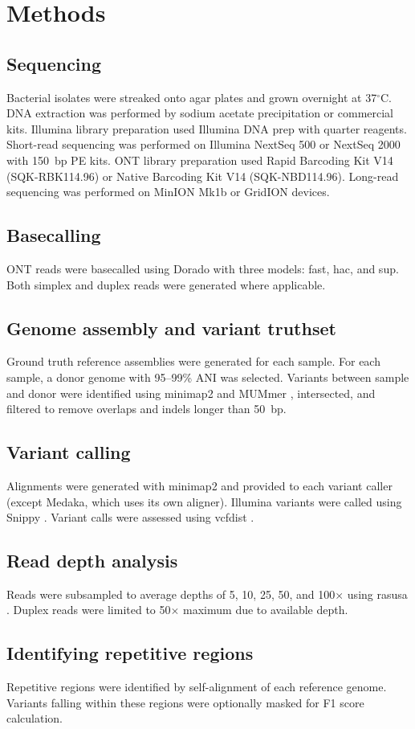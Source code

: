 \documentclass[11pt]{article}
\begin{document}
\section{Methods}

\subsection{Sequencing}
Bacterial isolates were streaked onto agar plates and grown overnight at 37$^\circ$C. DNA extraction was performed by sodium acetate precipitation or commercial kits. Illumina library preparation used Illumina DNA prep with quarter reagents. Short-read sequencing was performed on Illumina NextSeq 500 or NextSeq 2000 with 150~bp PE kits. ONT library preparation used Rapid Barcoding Kit V14 (SQK-RBK114.96) or Native Barcoding Kit V14 (SQK-NBD114.96). Long-read sequencing was performed on MinION Mk1b or GridION devices.

\subsection{Basecalling}
ONT reads were basecalled using Dorado with three models: fast, hac, and sup. Both simplex and duplex reads were generated where applicable.

\subsection{Genome assembly and variant truthset}
Ground truth reference assemblies were generated for each sample. For each sample, a donor genome with 95--99\% ANI was selected. Variants between sample and donor were identified using minimap2 \citep{li2018} and MUMmer \citep{marcais2018}, intersected, and filtered to remove overlaps and indels longer than 50~bp.

\subsection{Variant calling}
Alignments were generated with minimap2 and provided to each variant caller (except Medaka, which uses its own aligner). Illumina variants were called using Snippy \citep{seemann2015}. Variant calls were assessed using vcfdist \citep{shaw2021}.

\subsection{Read depth analysis}
Reads were subsampled to average depths of 5, 10, 25, 50, and 100$\times$ using rasusa \citep{hall2022}. Duplex reads were limited to 50$\times$ maximum due to available depth.

\subsection{Identifying repetitive regions}
Repetitive regions were identified by self-alignment of each reference genome. Variants falling within these regions were optionally masked for F1 score calculation.


\end{document}
